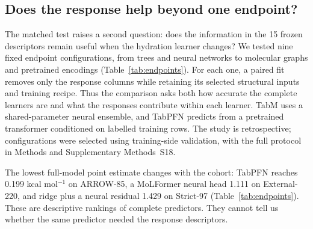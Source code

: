 \subsection*{Does the response help beyond one endpoint?}

The matched test raises a second question: does the information in the 15 frozen
descriptors remain useful when the hydration learner changes? We tested nine
fixed endpoint configurations, from trees and neural networks to molecular
graphs and pretrained encodings (Table~\ref{tab:endpoints}). For each one, a
paired fit removes only the response columns while retaining its selected
structural inputs and training recipe. Thus the comparison asks both how accurate
the complete learners are and what the responses contribute within each learner.
TabM uses a shared-parameter neural ensemble, and TabPFN predicts from a
pretrained transformer conditioned on labelled training rows.\cite{tabm2025,tabpfn2025,tabpfn35}
The study is retrospective; configurations were selected using training-side
validation, with the full protocol in Methods and Supplementary Methods~S18.

\begin{table}[!ht]
\centering\small
\caption{\textbf{Endpoint mechanisms and their measured accuracy.}
All entries include the 15 response descriptors. MAE is in kcal mol$^{-1}$.
Boldface marks the lowest displayed MAE in each column among these fixed
full-response configurations; it does not imply a statistically resolved rank.
The first three columns use the ARROW and external evaluation identities; Strict-97 is nested
within External-220. Neural and TabPFN predictions average five seeds, tree
controls three. The final column is a separate exploratory size-held-out refit on
1,160 training and 205 held-out molecules, using three seeds for every method.
A dash means not evaluated, not zero error. Supplementary Table~13 includes
matched no-response controls and common-three-seed results.}
\label{tab:endpoints}

\end{table}

The lowest full-model point estimate changes with the cohort: TabPFN reaches
0.199 kcal mol$^{-1}$ on ARROW-85, a MoLFormer neural head 1.111 on External-220,
and ridge plus a neural residual 1.429 on Strict-97 (Table~\ref{tab:endpoints}).
These are descriptive rankings of complete predictors. They cannot tell us
whether the same predictor needed the response descriptors.

